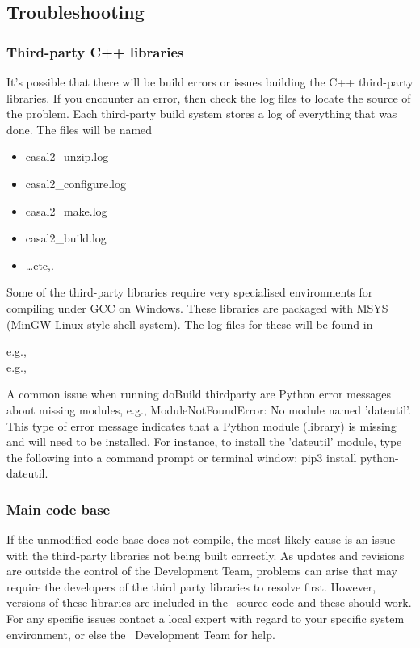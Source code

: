 \subsection{Troubleshooting}

\subsubsection{Third-party C++ libraries}

It's possible that there will be build errors or issues building the C++ third-party libraries. If you encounter an error, then check the log files to locate the source of the problem. Each third-party build system stores a log of everything that was done. The files will be named

\begin{itemize}
	\item casal2\_unzip.log
	\item casal2\_configure.log
	\item casal2\_make.log
	\item casal2\_build.log
	\item \dots etc,.
\end{itemize}

Some of the third-party libraries require very specialised environments for compiling under GCC on Windows. These libraries are packaged with MSYS (MinGW Linux style shell system). The log files for these will be found in 

e.g., \\
e.g., 

A common issue when running doBuild thirdparty are Python error messages about missing modules, e.g., ModuleNotFoundError: No module named 'dateutil'. This type of error message indicates that a Python module (library) is missing and will need to be installed. For instance, to install the 'dateutil' module, type the following into a command prompt or terminal window: pip3 install python-dateutil.  

\subsubsection{Main code base}

If the unmodified code base does not compile, the most likely cause is an issue with the third-party libraries not being built correctly. As updates and revisions are outside the control of the Development Team, problems can arise that may require the developers of the third party libraries to resolve first. However, versions of these libraries are included in the \CNAME\ source code and these should work. For any specific issues contact a local expert with regard to your specific system environment, or else the \CNAME\ Development Team for help.
